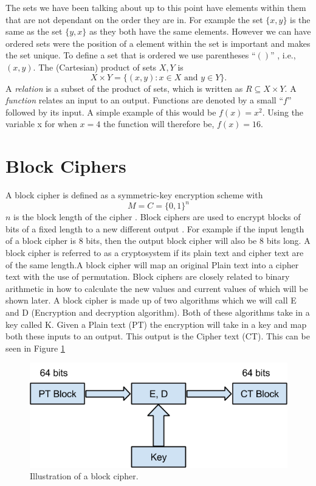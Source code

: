 \documentclass[11pt,a4paper]{report}
\begin{document}
The sets we have been talking about up to this point have elements within them that are not dependant on the order they are in. For example the set $\{x,y\}$ is the same as the set $\{y, x\}$ as they both have the same elements. However we can have ordered sets were the position of a element within the set is important and makes the set unique. To define a set that is ordered we use parentheses  ``$()$'' , i.e., $(x,y)$. 
The (Cartesian) product of sets $X, Y$ is
\begin{displaymath}
  X \times Y = \{(x,y) : x \in X \text{ and } y \in Y\}.
\end{displaymath}
A \emph{relation} is a subset of the product of sets, which is written as $R \subseteq X \times Y$. A \emph{function} relates an input to an output. Functions are denoted by a small ``$f$'' followed by its input. A simple example of this would be $f(x) = x^2$. Using the variable x for when $x=4$ the function will therefore be, $f(x) = 16$.


\section{Block Ciphers}
\label{subsec:BCipher}
A block cipher is defined as a symmetric-key encryption scheme with
\begin{displaymath}
 M = C = \{0,1\}^{n}
\end{displaymath}
 $n$ is the block length of the cipher \cite{DBLP:series/isc/DelfsK07}. Block ciphers are used to encrypt blocks of bits of a fixed length to a new different output \cite{DBLP:books/sp/Buchmann02}. For example if the input length of a block cipher is 8 bits, then the output block cipher will also be 8 bits long. A block cipher is referred to as a cryptosystem if its plain text and cipher text are of the same length.A block cipher will map an original Plain text into a cipher text with the use of permutation. Block ciphers are closely related to binary arithmetic in how to calculate the new values and current values of which will be shown later.
A block cipher is made up of two algorithms which we will call E and D (Encryption and decryption algorithm). Both of these algorithms take in a key called K. Given a Plain text (PT) the encryption will take in a key and map both these inputs to an output. This output is the Cipher text (CT). This can be seen in Figure \ref*{fig:2.2.1} 


\begin{figure}[H]
\centering
\includegraphics[scale=0.5]{BlockCipher.png}
\caption{Illustration of a block cipher.}
\label{fig:2.2.1}
\end{figure}
\end{document}
